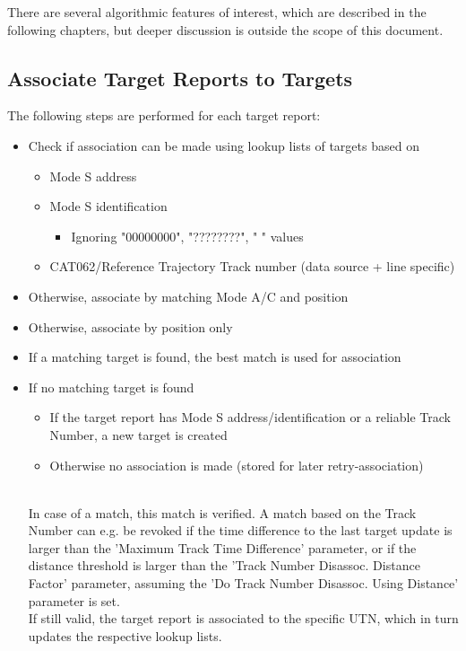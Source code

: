 There are several algorithmic features of interest, which are described in the following chapters, but deeper discussion is outside the scope of this document.

\subsection{Associate Target Reports to Targets}

The following steps are performed for each target report:
\begin{itemize}
\item Check if association can be made using lookup lists of targets based on
\begin{itemize}
\item Mode S address
\item Mode S identification
\begin{itemize}
\item Ignoring "00000000", "????????", "        " values
\end{itemize}
\item CAT062/Reference Trajectory Track number (data source + line specific)
\end{itemize}
\item Otherwise, associate by matching Mode A/C and position
\item Otherwise, associate by position only
\item If a matching target is found, the best match is used for association
\item If no matching target is found
\begin{itemize}
\item If the target report has Mode S address/identification or a reliable Track Number, a new target is created
\item Otherwise no association is made (stored for later retry-association)
\end{itemize}
\ \\

In case of a match, this match is verified. A match based on the Track Number can e.g. be revoked if the time difference to the last target update is larger than the 'Maximum Track Time Difference' parameter, 
or if the distance threshold is larger than the 'Track Number Disassoc. Distance Factor' parameter, assuming the 'Do Track Number Disassoc. Using Distance' parameter is set. \\

If still valid, the target report is associated to the specific UTN, which in turn updates the respective lookup lists.


\end{itemize}
